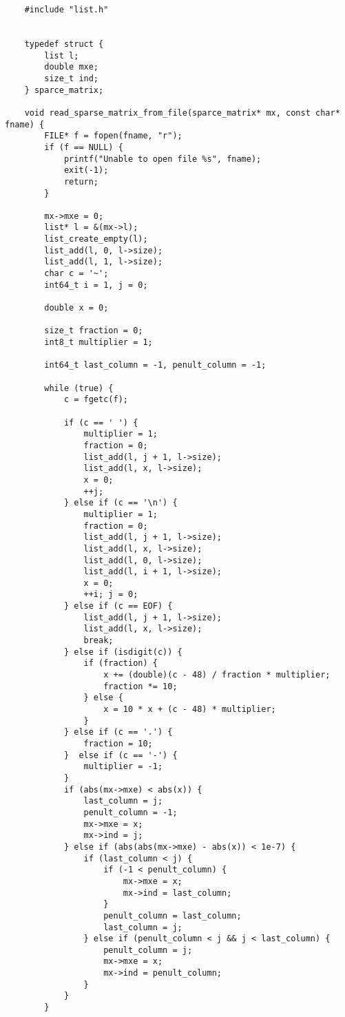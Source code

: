 \documentclass[a4paper]{article}
\newcounter{i}
\begin{document}
\begin{enumerate}[label=\textbf{\arabic*}.]
\begin{verbatim}
    #include "list.h"
    
    
    typedef struct {
        list l;
        double mxe;
        size_t ind;
    } sparce_matrix;
    
    void read_sparse_matrix_from_file(sparce_matrix* mx, const char* fname) {
        FILE* f = fopen(fname, "r");
        if (f == NULL) {
            printf("Unable to open file %s", fname);
            exit(-1);
            return;
        }
    
        mx->mxe = 0;
        list* l = &(mx->l);
        list_create_empty(l);
        list_add(l, 0, l->size);
        list_add(l, 1, l->size);
        char c = '~';
        int64_t i = 1, j = 0;
    
        double x = 0;
    
        size_t fraction = 0;
        int8_t multiplier = 1;
    
        int64_t last_column = -1, penult_column = -1;
    
        while (true) {
            c = fgetc(f);
            
            if (c == ' ') {
                multiplier = 1;
                fraction = 0;
                list_add(l, j + 1, l->size);
                list_add(l, x, l->size);
                x = 0;
                ++j;
            } else if (c == '\n') {
                multiplier = 1;
                fraction = 0;
                list_add(l, j + 1, l->size);
                list_add(l, x, l->size);
                list_add(l, 0, l->size);
                list_add(l, i + 1, l->size);
                x = 0;
                ++i; j = 0;
            } else if (c == EOF) {
                list_add(l, j + 1, l->size);
                list_add(l, x, l->size);
                break;
            } else if (isdigit(c)) {
                if (fraction) {
                    x += (double)(c - 48) / fraction * multiplier;
                    fraction *= 10;
                } else {
                    x = 10 * x + (c - 48) * multiplier;
                }
            } else if (c == '.') {
                fraction = 10;
            }  else if (c == '-') {
                multiplier = -1;
            }
            if (abs(mx->mxe) < abs(x)) {
                last_column = j;
                penult_column = -1;
                mx->mxe = x;
                mx->ind = j;
            } else if (abs(abs(mx->mxe) - abs(x)) < 1e-7) {
                if (last_column < j) {
                    if (-1 < penult_column) {
                        mx->mxe = x;
                        mx->ind = last_column;
                    }
                    penult_column = last_column;
                    last_column = j;
                } else if (penult_column < j && j < last_column) {
                    penult_column = j;
                    mx->mxe = x;
                    mx->ind = penult_column;
                }
            }
        }
    

\end{verbatim}
\end{enumerate}
\end{document}
